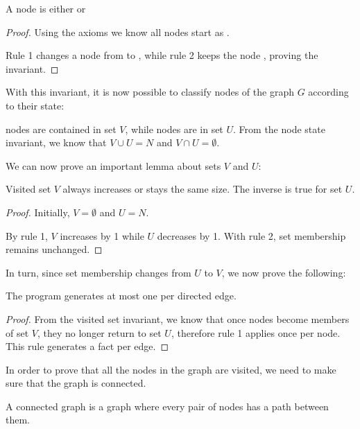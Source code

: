 \begin{invariant}
A node is either  or 
\end{invariant}
\begin{proof}
Using the axioms we know all nodes start as .

Rule 1 changes a node from  to , while rule 2
keeps the node , proving the invariant.
\end{proof}

With this invariant, it is now possible to classify nodes of the graph $G$
according to their state:

\begin{definition}  nodes are contained in set $V$,
while  nodes are in set $U$. From the node state invariant, we
know that $V \cup U = N$ and $V \cap U = \emptyset$.
\end{definition}

We can now prove an important lemma about sets $V$ and $U$:

\begin{invariant}
Visited set $V$ always increases or stays the same size. The inverse is true for
set $U$.
\end{invariant}
\begin{proof}
Initially, $V = \emptyset$ and $U = N$.

By rule 1, $V$ increases by 1 while $U$ decreases by 1. With rule 2, set
membership remains unchanged.
\end{proof}

In turn, since set membership changes from $U$ to $V$, we now prove the
following:

\begin{lemma}
The program generates at most one  per directed edge.
\end{lemma}
\begin{proof}
From the visited set invariant, we know that once nodes become members of set $V$,
they no longer return to set $U$, therefore rule 1 applies once per
node. This rule generates a  fact per edge.
\end{proof}

In order to prove that all the nodes in the graph are visited, we need to make
sure that the graph is connected.

\begin{definition}
A connected graph is a graph where every pair of nodes has a path between them.
\end{definition}

